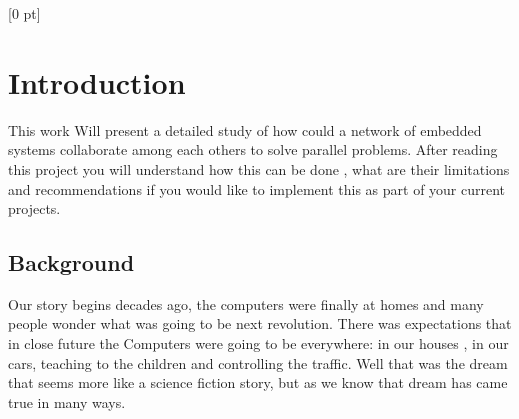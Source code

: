 
\titlespacing{\chapter}{0 pt}{30 pt}{50 pt}[0 pt]
\titleformat{\section}{\Large\bfseries}{\thesection}{0 pt}{\hspace{30 pt}}
\titleformat{\subsection}{\large\bfseries}{\thesubsection}{0 pt}{\hspace{30 pt}}
\pagestyle{fancy}
\fancyhead[LO,LE]{\footnotesize\textit{\leftmark}}
\fancyhead[RO,RE]{\thepage}
\fancyfoot[CO,CE]{}

\chapter{Introduction} %

\normalsize

This work Will present a detailed study of how could a network of embedded
systems collaborate among each others to solve parallel problems. After reading
this project you will understand how this can be done , what are their
limitations and recommendations if you would like to implement this as part of 
your current projects. 

\section{Background}
\vspace{30 pt}
\noindent

Our story begins decades ago, the computers were finally at homes and many
people wonder what was going to be next revolution. There was expectations that
in close future the Computers were going to be everywhere: in our houses , in
our cars, teaching to the children and controlling the traffic. Well that was
the dream that seems more like a science fiction story, but as we know that
dream has came true in many ways.

